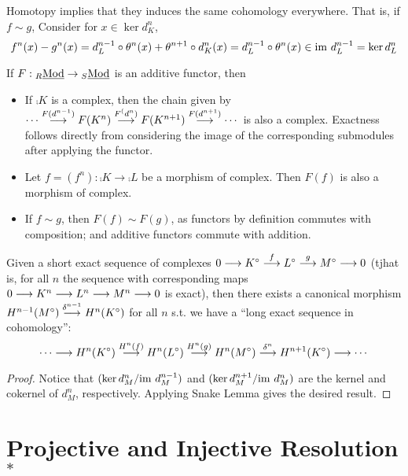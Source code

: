 \documentclass{article}
\begin{document}
\begin{remark}
    Homotopy implies that they induces the same cohomology everywhere. That is, if $f \sim g$, Consider for $x \in \ker d_K^n$,
    \[
        f^n(x) - g^n(x) = d_L^{n-1} \circ \theta^n(x) + \theta^{n+1} \circ d_K^n(x) = d_L^{n-1} \circ \theta^n(x) \in \mathrm{im}\  d_L^{n-1} = \ker d_L^n
    \]
\end{remark}

\begin{remark}
    If $F: {}_{R}\underline{\textup{Mod}} \to {}_{S}\underline{\textup{Mod}}$ is an additive functor, then
    \begin{itemize}
        \item If $\comp{K}$ is a complex, then the chain given by $\cdots \overset{F(d^{n-1})}{\longrightarrow} F(K^n) \overset{F^(d^n)}{\longrightarrow} F(K^{n+1}) \overset{F(d^{n+1})}{\longrightarrow} \cdots$ is also a complex. Exactness follows directly from considering the image of the corresponding submodules after applying the functor.
        \item Let $f = (f^n): \comp{K} \to \comp{L}$ be a morphism of complex. Then $F(f)$ is also a morphism of complex. 
        \item If $f \sim g$, then $F(f) \sim F(g)$, as functors by definition commutes with composition; and additive functors commute with addition.
    \end{itemize}
\end{remark}

\begin{proposition}
    Given a short exact sequence of complexes $0 \longrightarrow K^{\circ} \overset{f}{\longrightarrow} L^{\circ} \overset{g}{\longrightarrow} M^{\circ} \longrightarrow 0$ (tjhat is, for all $n$ the sequence with corresponding maps $0 \longrightarrow K^n \longrightarrow L^n \longrightarrow M^n \longrightarrow 0$ is exact), then there exists a canonical morphism $H^{n-1}(M^{\circ}) \overset{\delta^{n-1}}{\longrightarrow} H^n(K^{\circ})$ for all $n$ s.t. we have a ``long exact sequence in cohomology'':
    \[
        \cdots \longrightarrow H^n(K^{\circ}) \overset{H^n(f)}{\longrightarrow} H^n(L^{\circ}) \overset{H^n(g)}{\longrightarrow} H^n(M^{\circ}) \overset{\delta^n}{\longrightarrow} H^{n+1}(K^{\circ}) \longrightarrow \cdots
    \]
\end{proposition}

\begin{proof}
    Notice that $(\ker d_M^n/\mathrm{im}\  d_M^{n-1})$ and $(\ker d_M^{n+1}/\mathrm{im}\  d_M^n)$ are the kernel and cokernel of $d_M^n$, respectively. Applying Snake Lemma gives the desired result.
\end{proof}

\section{Projective and Injective Resolution$^*$}
\end{document}
